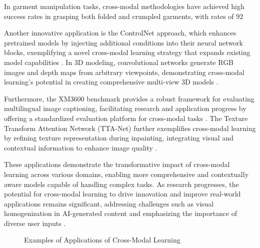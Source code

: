 In garment manipulation tasks, cross-modal methodologies have achieved high success rates in grasping both folded and crumpled garments, with rates of 92%

Another innovative application is the ControlNet approach, which enhances pretrained models by injecting additional conditions into their neural network blocks, exemplifying a novel cross-modal learning strategy that expands existing model capabilities \cite{zhang2023adding}. In 3D modeling, convolutional networks generate RGB images and depth maps from arbitrary viewpoints, demonstrating cross-modal learning's potential in creating comprehensive multi-view 3D models \cite{tatarchenko2016multiview3dmodelssingle}.

Furthermore, the XM3600 benchmark provides a robust framework for evaluating multilingual image captioning, facilitating research and application progress by offering a standardized evaluation platform for cross-modal tasks \cite{thapliyal2022crossmodal3600massivelymultilingualmultimodal}. The Texture Transform Attention Network (TTA-Net) further exemplifies cross-modal learning by refining texture representation during inpainting, integrating visual and contextual information to enhance image quality \cite{kim2020texturetransformattentionrealistic}.

These applications demonstrate the transformative impact of cross-modal learning across various domains, enabling more comprehensive and contextually aware models capable of handling complex tasks. As research progresses, the potential for cross-modal learning to drive innovation and improve real-world applications remains significant, addressing challenges such as visual homogenization in AI-generated content and emphasizing the importance of diverse user inputs \cite{palmini2024patternscreativityuserinput}.

\begin{figure}[ht!]
\centering
{}\hspace{0.03\textwidth}
\caption{Examples of Applications of Cross-Modal Learning}\label{fig:retrieve_fig_3}
\end{figure}

